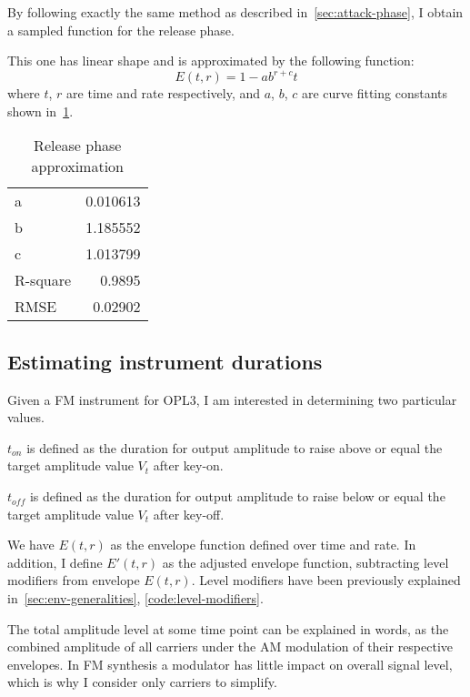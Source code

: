 \documentclass[twoside,twocolumn]{article}
\begin{document}
By following exactly the same method as described in~\ref{sec:attack-phase}, I obtain a
sampled function for the release phase.

This one has linear shape and is approximated by the following function:
\begin{equation}
E(t,r) = 1-a b^{r+c} t
\end{equation}
where $t$, $r$ are time and rate respectively, and $a$, $b$, $c$ are curve fitting constants
shown in~\ref{tab:env-release-fit}.

\begin{table}
\begin{center}
\begin{tabular}{lr}
\toprule
a & 0.010613 \\
b & 1.185552 \\
c & 1.013799 \\
\midrule
R-square & 0.9895 \\
RMSE & 0.02902 \\
\bottomrule
\end{tabular}
\end{center}
\caption{Release phase approximation}\label{tab:env-release-fit}
\end{table}

\subsection{Estimating instrument durations}

Given a FM instrument for OPL3, I am interested in determining two particular values.

$t_{on}$ is defined as the duration for output amplitude to raise above or equal the target
amplitude value $V_t$ after key-on.

$t_{off}$ is defined as the duration for output amplitude to raise below or equal the target
amplitude value $V_t$ after key-off.

We have $E(t,r)$ as the envelope function defined over time and rate. In addition, I define
$E'(t,r)$ as the adjusted envelope function, subtracting level modifiers from envelope $E(t,r)$.
Level modifiers have been previously explained in~\ref{sec:env-generalities}, \ref{code:level-modifiers}.

The total amplitude level at some time point can be explained in words, as the combined
amplitude of all carriers under the AM modulation of their respective envelopes. In FM
synthesis a modulator has little impact on overall signal level, which is why I consider
only carriers to simplify.
\end{document}
